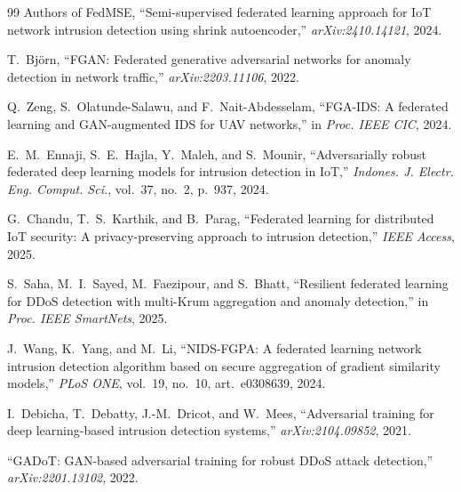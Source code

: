 \documentclass[11pt,a4paper]{article}
\begin{document}
\begin{thebibliography}{99}
Authors of FedMSE, ``Semi-supervised federated learning approach for IoT network
intrusion detection using shrink autoencoder,'' \emph{arXiv:2410.14121}, 2024.

T.~Bj\"{o}rn, ``FGAN: Federated generative adversarial networks for anomaly
detection in network traffic,'' \emph{arXiv:2203.11106}, 2022.

Q.~Zeng, S.~Olatunde-Salawu, and F.~Nait-Abdesselam, ``FGA-IDS: A federated
learning and GAN-augmented IDS for UAV networks,'' in \emph{Proc. IEEE CIC}, 2024.

E.~M.~Ennaji, S.~E.~Hajla, Y.~Maleh, and S.~Mounir, ``Adversarially robust
federated deep learning models for intrusion detection in IoT,'' \emph{Indones. J.
Electr. Eng. Comput. Sci.}, vol.~37, no.~2, p.~937, 2024.

G.~Chandu, T.~S.~Karthik, and B.~Parag, ``Federated learning for distributed IoT
security: A privacy-preserving approach to intrusion detection,'' \emph{IEEE
Access}, 2025.

S.~Saha, M.~I.~Sayed, M.~Faezipour, and S.~Bhatt, ``Resilient federated learning
for DDoS detection with multi-Krum aggregation and anomaly detection,'' in
\emph{Proc. IEEE SmartNets}, 2025.

J.~Wang, K.~Yang, and M.~Li, ``NIDS-FGPA: A federated learning network intrusion
detection algorithm based on secure aggregation of gradient similarity models,''
\emph{PLoS ONE}, vol.~19, no.~10, art.~e0308639, 2024.

I.~Debicha, T.~Debatty, J.-M.~Dricot, and W.~Mees, ``Adversarial training for
deep learning-based intrusion detection systems,'' \emph{arXiv:2104.09852}, 2021.

``GADoT: GAN-based adversarial training for robust DDoS attack detection,''
\emph{arXiv:2201.13102}, 2022.

\end{thebibliography}
\end{document}
